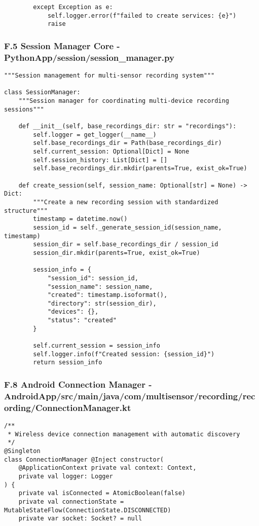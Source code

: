 \documentclass[11pt,a4paper]{article}
\begin{document}
{{\begin{verbatim}
        except Exception as e:
            self.logger.error(f"failed to create services: {e}")
            raise
\end{verbatim}

\subsubsection{F.5 Session Manager Core - PythonApp/session/session_manager.py}

\begin{verbatim}
"""Session management for multi-sensor recording system"""

class SessionManager:
    """Session manager for coordinating multi-device recording sessions"""

    def __init__(self, base_recordings_dir: str = "recordings"):
        self.logger = get_logger(__name__)
        self.base_recordings_dir = Path(base_recordings_dir)
        self.current_session: Optional[Dict] = None
        self.session_history: List[Dict] = []
        self.base_recordings_dir.mkdir(parents=True, exist_ok=True)

    def create_session(self, session_name: Optional[str] = None) -> Dict:
        """Create a new recording session with standardized structure"""
        timestamp = datetime.now()
        session_id = self._generate_session_id(session_name, timestamp)
        session_dir = self.base_recordings_dir / session_id
        session_dir.mkdir(parents=True, exist_ok=True)

        session_info = {
            "session_id": session_id,
            "session_name": session_name,
            "created": timestamp.isoformat(),
            "directory": str(session_dir),
            "devices": {},
            "status": "created"
        }

        self.current_session = session_info
        self.logger.info(f"Created session: {session_id}")
        return session_info
\end{verbatim}

\subsubsection{F.8 Android Connection Manager - AndroidApp/src/main/java/com/multisensor/recording/recording/ConnectionManager.kt}

\begin{verbatim}
/**
 * Wireless device connection management with automatic discovery
 */
@Singleton
class ConnectionManager @Inject constructor(
    @ApplicationContext private val context: Context,
    private val logger: Logger
) {
    private val isConnected = AtomicBoolean(false)
    private val connectionState = MutableStateFlow(ConnectionState.DISCONNECTED)
    private var socket: Socket? = null


\end{verbatim}}}
\end{document}
